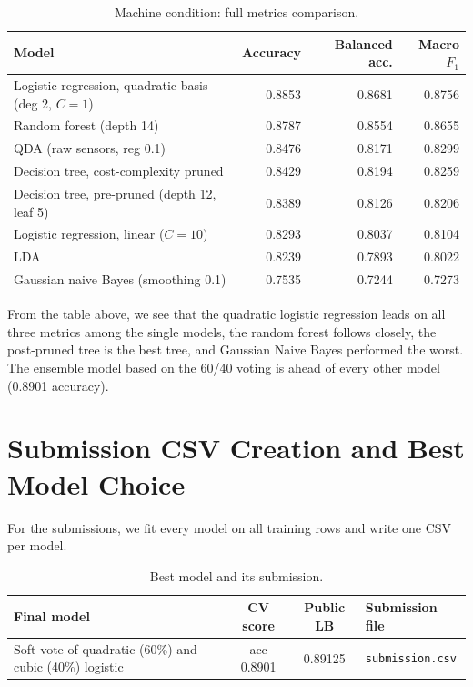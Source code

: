 \documentclass[11pt]{article}
\begin{document}
\begin{table}[H]
\centering
\small
\setlength{\tabcolsep}{5pt}
\begin{tabular}{@{}>{\raggedright\arraybackslash}p{6.4cm}rrr@{}}
\toprule
Model & Accuracy & Balanced acc. & Macro $F_1$ \\
\midrule
Logistic regression, quadratic basis (deg 2, $C=1$) & 0.8853 & 0.8681 & 0.8756 \\
Random forest (depth 14) & 0.8787 & 0.8554 & 0.8655 \\
QDA (raw sensors, reg 0.1) & 0.8476 & 0.8171 & 0.8299 \\
Decision tree, cost-complexity pruned & 0.8429 & 0.8194 & 0.8259 \\
Decision tree, pre-pruned (depth 12, leaf 5) & 0.8389 & 0.8126 & 0.8206 \\
Logistic regression, linear ($C=10$) & 0.8293 & 0.8037 & 0.8104 \\
LDA & 0.8239 & 0.7893 & 0.8022 \\
Gaussian naive Bayes (smoothing 0.1) & 0.7535 & 0.7244 & 0.7273 \\
\bottomrule
\end{tabular}
\caption{Machine condition: full metrics comparison.}
\end{table}

From the table above, we see that the quadratic logistic regression leads on all three metrics among the single models, the random forest follows closely, the post-pruned tree is the best tree, and Gaussian Naive Bayes performed the worst. The ensemble model based on the 60/40 voting is ahead of every other model (0.8901 accuracy).

\section{Submission CSV Creation and Best Model Choice}

For the submissions, we fit every model on all training rows and write one CSV per model.

\begin{table}[H]
\centering
\caption{Best model and its submission.}
\label{tab:final}
\small
\begin{tabular}{@{}>{\raggedright\arraybackslash}p{4.9cm}cc>{\raggedright\arraybackslash}p{3.1cm}@{}}
\toprule
Final model & CV score & Public LB & Submission file \\
\midrule
Soft vote of quadratic (60\%) and cubic (40\%) logistic & acc 0.8901 & 0.89125 & \texttt{submission.csv} \\
\bottomrule
\end{tabular}
\end{table}
\end{document}
